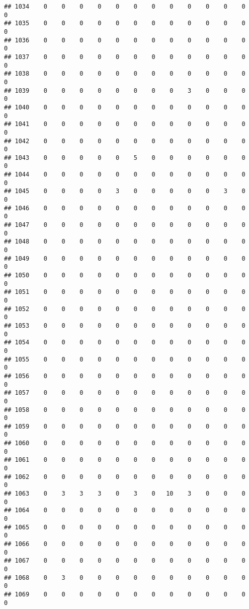 \documentclass[]{article}
\begin{document}
\begin{verbatim}
## 1034    0    0    0    0    0    0    0    0    0    0    0    0    0
## 1035    0    0    0    0    0    0    0    0    0    0    0    0    0
## 1036    0    0    0    0    0    0    0    0    0    0    0    0    0
## 1037    0    0    0    0    0    0    0    0    0    0    0    0    0
## 1038    0    0    0    0    0    0    0    0    0    0    0    0    0
## 1039    0    0    0    0    0    0    0    0    3    0    0    0    0
## 1040    0    0    0    0    0    0    0    0    0    0    0    0    0
## 1041    0    0    0    0    0    0    0    0    0    0    0    0    0
## 1042    0    0    0    0    0    0    0    0    0    0    0    0    0
## 1043    0    0    0    0    0    5    0    0    0    0    0    0    0
## 1044    0    0    0    0    0    0    0    0    0    0    0    0    0
## 1045    0    0    0    0    3    0    0    0    0    0    3    0    0
## 1046    0    0    0    0    0    0    0    0    0    0    0    0    0
## 1047    0    0    0    0    0    0    0    0    0    0    0    0    0
## 1048    0    0    0    0    0    0    0    0    0    0    0    0    0
## 1049    0    0    0    0    0    0    0    0    0    0    0    0    0
## 1050    0    0    0    0    0    0    0    0    0    0    0    0    0
## 1051    0    0    0    0    0    0    0    0    0    0    0    0    0
## 1052    0    0    0    0    0    0    0    0    0    0    0    0    0
## 1053    0    0    0    0    0    0    0    0    0    0    0    0    0
## 1054    0    0    0    0    0    0    0    0    0    0    0    0    0
## 1055    0    0    0    0    0    0    0    0    0    0    0    0    0
## 1056    0    0    0    0    0    0    0    0    0    0    0    0    0
## 1057    0    0    0    0    0    0    0    0    0    0    0    0    0
## 1058    0    0    0    0    0    0    0    0    0    0    0    0    0
## 1059    0    0    0    0    0    0    0    0    0    0    0    0    0
## 1060    0    0    0    0    0    0    0    0    0    0    0    0    0
## 1061    0    0    0    0    0    0    0    0    0    0    0    0    0
## 1062    0    0    0    0    0    0    0    0    0    0    0    0    0
## 1063    0    3    3    3    0    3    0   10    3    0    0    0    0
## 1064    0    0    0    0    0    0    0    0    0    0    0    0    0
## 1065    0    0    0    0    0    0    0    0    0    0    0    0    0
## 1066    0    0    0    0    0    0    0    0    0    0    0    0    0
## 1067    0    0    0    0    0    0    0    0    0    0    0    0    0
## 1068    0    3    0    0    0    0    0    0    0    0    0    0    0
## 1069    0    0    0    0    0    0    0    0    0    0    0    0    0

\end{verbatim}
\end{document}
